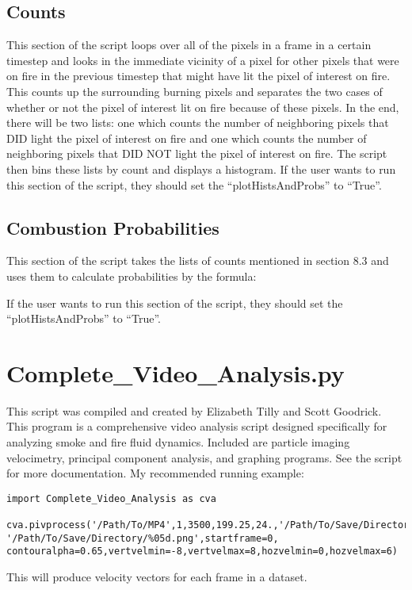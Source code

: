 \documentclass{article}
\begin{document}
\subsection{Counts}

This section of the script loops over all of the pixels in a frame in a certain timestep and looks in the immediate vicinity of a pixel for other pixels that were on fire in the previous timestep that might have lit the pixel of interest on fire. This counts up the surrounding burning pixels and separates the two cases of whether or not the pixel of interest lit on fire because of these pixels. In the end, there will be two lists: one which counts the number of neighboring pixels that DID light the pixel of interest on fire and one which counts the number of neighboring pixels that DID NOT light the pixel of interest on fire. The script then bins these lists by count and displays a histogram. If the user wants to run this section of the script, they should set the ``plotHistsAndProbs'' to ``True''. 

\subsection{Combustion Probabilities}

This section of the script takes the lists of counts mentioned in section 8.3 and uses them to calculate probabilities by the formula:



If the user wants to run this section of the script, they should set the ``plotHistsAndProbs'' to ``True''. 

\section{Complete\_Video\_Analysis.py}
This script was compiled and created by Elizabeth Tilly and Scott Goodrick. This program is a comprehensive video analysis script designed specifically for analyzing smoke and fire fluid dynamics. Included are particle imaging velocimetry, principal component analysis, and graphing programs. See the script for more documentation. My recommended running example:

\begin{lstlisting}
import Complete_Video_Analysis as cva

cva.pivprocess('/Path/To/MP4',1,3500,199.25,24.,'/Path/To/Save/Directory/%05d.npz', '/Path/To/Save/Directory/%05d.png',startframe=0, contouralpha=0.65,vertvelmin=-8,vertvelmax=8,hozvelmin=0,hozvelmax=6)        

\end{lstlisting}

This will produce velocity vectors for each frame in a dataset.
\end{document}
